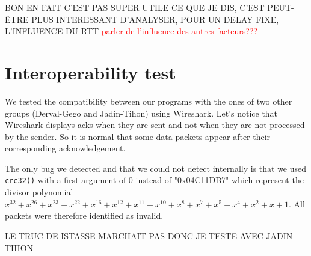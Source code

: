 \documentclass[11pt,a4paper]{article}
\begin{document}
BON EN FAIT C'EST PAS SUPER UTILE CE QUE JE DIS, C'EST PEUT-ÊTRE PLUS INTERESSANT D'ANALYSER, POUR UN DELAY FIXE, L'INFLUENCE DU RTT
\textcolor{red}{parler de l'influence des autres facteurs???}

\section{Interoperability test }

We tested the compatibility between our programs with the ones of two other groups (Derval-Gego and Jadin-Tihon) using Wireshark. Let's notice that Wireshark displays acks when they are sent and not when they are not processed by the sender. So it is normal that some data packets appear after their corresponding acknowledgement.

The only bug we detected and that we could not detect internally is that we used \texttt{crc32()} with a first argument of $0$ instead of "0x04C11DB7" which represent the divisor polynomial $x^{32} +x^{26} +x^{23} +x^{22} +x^{16} +x^{12} +x^{11} +x^{10} +x^{8} + x^{7} + x^{5} + x^{4} + x^{2} + x + 1$. All packets were therefore identified as invalid.

LE TRUC DE ISTASSE MARCHAIT PAS DONC JE TESTE AVEC JADIN-TIHON
\end{document}
